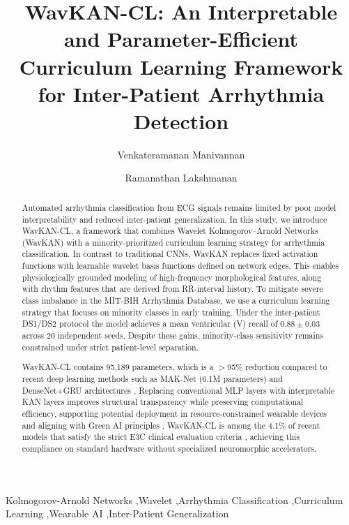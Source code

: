 \documentclass[final,5p,times,twocolumn,number]{elsarticle}
\begin{document}
\begin{frontmatter}

\title{WavKAN-CL: An Interpretable and Parameter-Efficient Curriculum Learning Framework for Inter-Patient Arrhythmia Detection}

\author[first]{Venkateramanan Manivannan}
\author[first]{Ramanathan Lakshmanan}



\begin{abstract}
Automated arrhythmia classification from ECG signals remains limited by poor model interpretability and reduced inter-patient generalization. In this study, we introduce WavKAN-CL, a framework that combines Wavelet Kolmogorov--Arnold Networks (WavKAN) with a minority-prioritized curriculum learning strategy for arrhythmia classification. In contrast to traditional CNNs, WavKAN replaces fixed activation functions with learnable wavelet basis functions defined on network edges. This enables physiologically grounded modeling of high-frequency morphological features, along with rhythm features that are derived from RR-interval history. To mitigate severe class imbalance in the MIT-BIH Arrhythmia Database, we use a curriculum learning strategy that focuses on minority classes in early training. Under the inter-patient DS1/DS2 protocol the model achieves a mean ventricular (V) recall of $0.88 \pm 0.03$ across 20 independent seeds. Despite these gains, minority-class sensitivity remains constrained under strict patient-level separation.

WavKAN-CL contains 95,189 parameters, which is a $>$95\% reduction compared to recent deep learning methods such as MAK-Net (6.1M parameters) \cite{zhao_mak-net_2025} and DenseNet+GRU architectures \cite{guo_inter-patient_2019}. Replacing conventional MLP layers with interpretable KAN layers improves structural transparency while preserving computational efficiency, supporting potential deployment in resource-constrained wearable devices and aligning with Green AI principles \cite{farag_tiny_2023}. WavKAN-CL is among the 4.1\% of recent models that satisfy the strict E3C clinical evaluation criteria \cite{silva_systematic_2025}, achieving this compliance on standard hardware without specialized neuromorphic accelerators.
\end{abstract}

\begin{keyword}
Kolmogorov-Arnold Networks \sep Wavelet \sep Arrhythmia Classification \sep Curriculum Learning \sep Wearable AI \sep Inter-Patient Generalization
\end{keyword}

\end{frontmatter}
\end{document}
